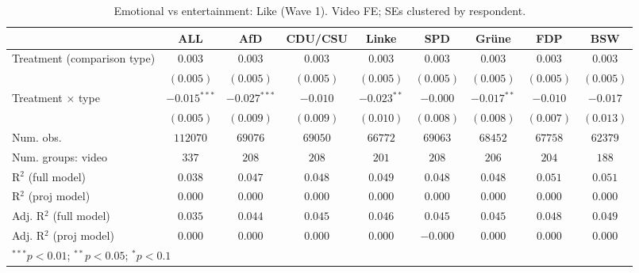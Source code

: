
\begin{table}
\begin{center}
\begin{tabular}{l c c c c c c c c}
\hline
 & ALL & AfD & CDU/CSU & Linke & SPD & Grüne & FDP & BSW \\
\hline
Treatment (comparison type) & $0.003$        & $0.003$        & $0.003$   & $0.003$       & $0.003$   & $0.003$       & $0.003$   & $0.003$   \\
                            & $(0.005)$      & $(0.005)$      & $(0.005)$ & $(0.005)$     & $(0.005)$ & $(0.005)$     & $(0.005)$ & $(0.005)$ \\
Treatment × type            & $-0.015^{***}$ & $-0.027^{***}$ & $-0.010$  & $-0.023^{**}$ & $-0.000$  & $-0.017^{**}$ & $-0.010$  & $-0.017$  \\
                            & $(0.005)$      & $(0.009)$      & $(0.009)$ & $(0.010)$     & $(0.008)$ & $(0.008)$     & $(0.007)$ & $(0.013)$ \\
\hline
Num. obs.                   & $112070$       & $69076$        & $69050$   & $66772$       & $69063$   & $68452$       & $67758$   & $62379$   \\
Num. groups: video          & $337$          & $208$          & $208$     & $201$         & $208$     & $206$         & $204$     & $188$     \\
R$^2$ (full model)          & $0.038$        & $0.047$        & $0.048$   & $0.049$       & $0.048$   & $0.048$       & $0.051$   & $0.051$   \\
R$^2$ (proj model)          & $0.000$        & $0.000$        & $0.000$   & $0.000$       & $0.000$   & $0.000$       & $0.000$   & $0.000$   \\
Adj. R$^2$ (full model)     & $0.035$        & $0.044$        & $0.045$   & $0.046$       & $0.045$   & $0.045$       & $0.048$   & $0.049$   \\
Adj. R$^2$ (proj model)     & $0.000$        & $0.000$        & $0.000$   & $0.000$       & $-0.000$  & $0.000$       & $0.000$   & $0.000$   \\
\hline
\multicolumn{9}{l}{\scriptsize{$^{***}p<0.01$; $^{**}p<0.05$; $^{*}p<0.1$}}
\end{tabular}
\caption{Emotional vs entertainment: Like (Wave 1). Video FE; SEs clustered by respondent.}
\label{tab:compare_emotional_vs_entertainment_like}
\end{center}
\end{table}
